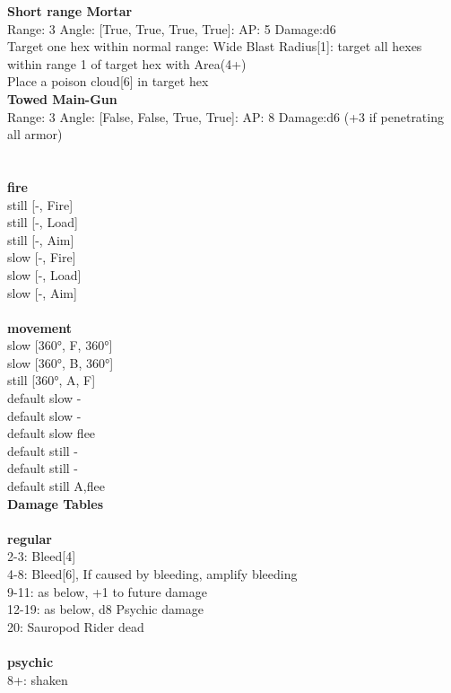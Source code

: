 {\bf Short range Mortar } \\



Range: 3  Angle: [True, True, True, True]: AP: 5 Damage:d6 \\
Target one hex within normal range: Wide Blast Radius[1]: target all hexes within range 1 of target hex with Area(4+)\\ 
Place a poison cloud[6] in target hex\\ 




{\bf Towed Main-Gun } \\



Range: 3  Angle: [False, False, True, True]: AP: 8 Damage:d6 (+3 if penetrating all armor) \\




 
\ \\



\ \\ {\bf fire } \\
still [-, Fire] \\
still [-, Load] \\
still [-, Aim] \\
slow [-, Fire] \\
slow [-, Load] \\
slow [-, Aim] \\
\ \\ {\bf movement } \\
slow [360°, F, 360°] \\
slow [360°, B, 360°] \\
still [360°, A, F] \\
default slow - \\
default slow - \\
default slow flee \\
default still - \\
default still - \\
default still A,flee \\


{\bf Damage Tables} \\
\ \\ {\bf regular } \\
2-3: Bleed[4] \\
4-8: Bleed[6], If caused by bleeding, amplify bleeding \\
9-11: as below, +1 to future damage \\
12-19: as below, d8 Psychic damage \\
20: Sauropod Rider dead \\
\ \\ {\bf psychic } \\
8+: shaken \\










